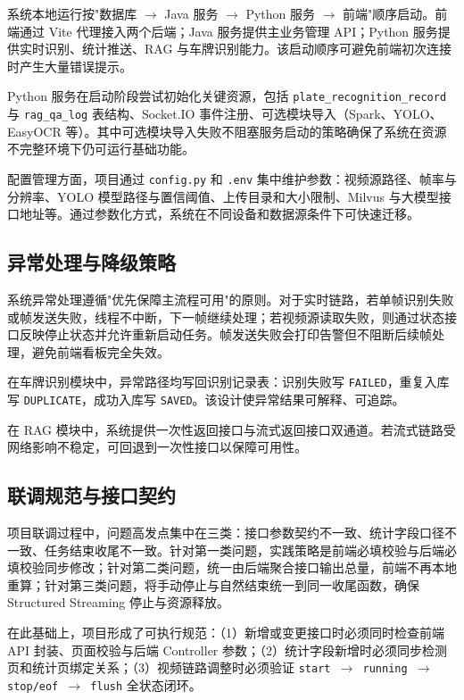 \documentclass{wzuthesis} %
\begin{document}
系统本地运行按"数据库 $\rightarrow$ Java 服务 $\rightarrow$ Python 服务 $\rightarrow$ 前端"顺序启动。前端通过 Vite 代理接入两个后端；Java 服务提供主业务管理 API；Python 服务提供实时识别、统计推送、RAG 与车牌识别能力。该启动顺序可避免前端初次连接时产生大量错误提示。

Python 服务在启动阶段尝试初始化关键资源，包括 \texttt{plate\_recognition\_record} 与 \texttt{rag\_qa\_log} 表结构、Socket.IO 事件注册、可选模块导入（Spark、YOLO、EasyOCR 等）。其中可选模块导入失败不阻塞服务启动的策略确保了系统在资源不完整环境下仍可运行基础功能。

配置管理方面，项目通过 \texttt{config.py} 和 \texttt{.env} 集中维护参数：视频源路径、帧率与分辨率、YOLO 模型路径与置信阈值、上传目录和大小限制、Milvus 与大模型接口地址等。通过参数化方式，系统在不同设备和数据源条件下可快速迁移。

\subsection{异常处理与降级策略}

系统异常处理遵循"优先保障主流程可用"的原则。对于实时链路，若单帧识别失败或帧发送失败，线程不中断，下一帧继续处理；若视频源读取失败，则通过状态接口反映停止状态并允许重新启动任务。帧发送失败会打印告警但不阻断后续帧处理，避免前端看板完全失效。

在车牌识别模块中，异常路径均写回识别记录表：识别失败写 \texttt{FAILED}，重复入库写 \texttt{DUPLICATE}，成功入库写 \texttt{SAVED}。该设计使异常结果可解释、可追踪。

在 RAG 模块中，系统提供一次性返回接口与流式返回接口双通道。若流式链路受网络影响不稳定，可回退到一次性接口以保障可用性。

\subsection{联调规范与接口契约}

项目联调过程中，问题高发点集中在三类：接口参数契约不一致、统计字段口径不一致、任务结束收尾不一致。针对第一类问题，实践策略是前端必填校验与后端必填校验同步修改；针对第二类问题，统一由后端聚合接口输出总量，前端不再本地重算；针对第三类问题，将手动停止与自然结束统一到同一收尾函数，确保 Structured Streaming 停止与资源释放。

在此基础上，项目形成了可执行规范：（1）新增或变更接口时必须同时检查前端 API 封装、页面校验与后端 Controller 参数；（2）统计字段新增时必须同步检测页和统计页绑定关系；（3）视频链路调整时必须验证 \texttt{start $\rightarrow$ running $\rightarrow$ stop/eof $\rightarrow$ flush} 全状态闭环。
\end{document}
